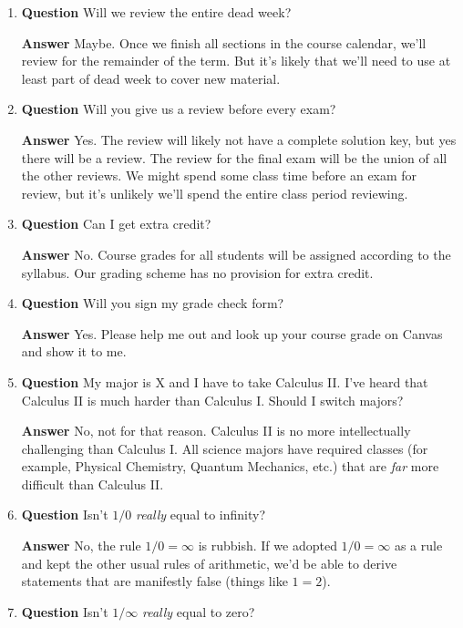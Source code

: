 \documentclass[12pt]{article}
\newcounter{ex}\setcounter{ex}{0}
\begin{document}
\begin{enumerate}
\item  \textbf{Question}  Will  we review the entire dead week?

\textbf{Answer} Maybe.  Once we finish all sections in the course 
calendar, we'll review for the remainder of the term.  But it's 
likely that we'll need to use at least part of dead week to cover
new material. 


\item  \textbf{Question}  Will you give us a review before every exam?

\textbf{Answer} Yes. The review will likely not have a complete solution key, 
but yes there will be a review. The review for the final exam will be the union 
of all the other reviews.  We might spend some class time before an exam for review, 
but it's unlikely we'll spend the entire class period reviewing. 

\item  \textbf{Question}  Can I get extra credit?

\textbf{Answer} No. Course grades for all students will be
assigned according to the syllabus. Our grading scheme has 
no provision for extra credit. 

\item  \textbf{Question}  Will you sign my grade check form?

\textbf{Answer} Yes.  Please help me out and look up your course grade on Canvas and 
show it to me.

\item  \textbf{Question}  My major is X and I have to take Calculus II.  I've heard 
that Calculus II is much harder than Calculus I.  Should I switch majors?

 \textbf{Answer}  No, not for that reason. Calculus II is no more intellectually 
 challenging than Calculus I. All science majors have required classes 
 (for example, Physical Chemistry, Quantum Mechanics, etc.) that
are \emph{far} more difficult than Calculus II. 

\item  \textbf{Question} Isn't \(1/0\) \emph{really} equal to infinity?

  \textbf{Answer}  No,  the rule  \(1/0 = \infty\)  is rubbish. If we adopted   
   \(1/0 = \infty\) as a rule and kept the other usual rules of arithmetic, we'd 
   be able to derive statements that
are manifestly false (things like \(1 = 2\)).


\item  \textbf{Question} Isn't \(1/\infty \) \emph{really} equal to zero?


\end{enumerate}
\end{document}
